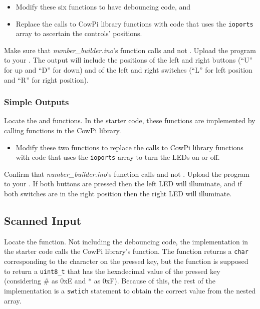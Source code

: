 \begin{itemize}
    \item Modify these six functions to have debouncing code, and
    \item Replace the calls to CowPi library functions with code that uses the \lstinline{ioports} array to ascertain the controls' positions.
\end{itemize}

Make sure that \textit{number\_builder.ino}'s  function calls  and not .
Upload the program to your \developmentboard.
The output will include the positions of the left and right buttons (``U'' for up and ``D'' for down) and of the left and right switches (``L'' for left position and ``R'' for right position).

\subsubsection{Simple Outputs}

Locate the  and  functions.
In the starter code, these functions are implemented by calling functions in the CowPi library.

\begin{itemize}
    \item Modify these two functions to replace the calls to CowPi library functions with code that uses the \lstinline{ioports} array to turn the LEDs on or off.
\end{itemize}

Confirm that \textit{number\_builder.ino}'s  function calls  and not .
Upload the program to your \developmentboard.
If both buttons are pressed then the left LED will illuminate, and if both switches are in the right position then the right LED will illuminate.

\subsection{Scanned Input}

Locate the  function.
Not including the debouncing code, the implementation in the starter code calls the CowPi library's  function.
The  function returns a \lstinline{char} corresponding to the character on the pressed key,
but the  function is supposed to return a \lstinline{uint8_t} that has the hexadecimal value of the pressed key (considering \# as 0xE and * as 0xF).
Because of this, the rest of the implementation is a \lstinline{swtich} statement to obtain the correct value from the  nested array.

